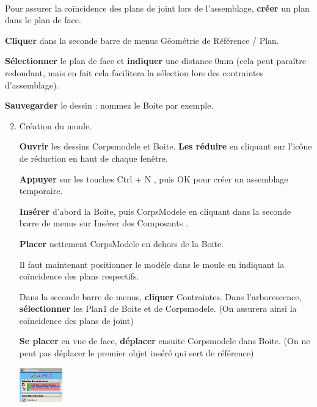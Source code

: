  ~\
 
Pour assurer la coïncidence des plans de joint lors de l'assemblage, \textbf{créer} un plan dans le plan de face.  

\textbf{Cliquer} dans la seconde barre de menus Géométrie de Référence / Plan.  

\textbf{Sélectionner} le plan de face et \textbf{indiquer} une distance 0mm (cela peut paraître redondant, mais en fait cela facilitera la sélection lors des contraintes d'assemblage). 

\textbf{Sauvegarder} le dessin : nommez le Boite par exemple.

\begin{enumerate}
 \setcounter{enumi}{1}
 \item   Création du moule. 

\textbf{Ouvrir} les dessins Corpsmodele et Boite. \textbf{Les réduire} en cliquant sur l'icône de réduction en haut de chaque fenêtre.  

\textbf{Appuyer} sur les touches \og Ctrl + N \fg, puis OK pour créer un assemblage temporaire. 

\textbf{Insérer} d'abord la Boite, puis CorpsModele en cliquant dans la seconde barre de menus sur \og Insérer des Composants \fg.

\textbf{Placer} nettement CorpsModele en dehors de la Boite. 

Il faut maintenant positionner le modèle dans le moule en indiquant la coïncidence des plans respectifs.

Dans la seconde barre de menus, \textbf{cliquer} Contraintes. Dans l'arborescence, \textbf{sélectionner} les Plan1 de Boite et de Corpsmodele. 
(On assurera ainsi la coïncidence des plans de joint)

\begin{minipage}{0.59\linewidth}
 \textbf{Se placer} en vue de face, \textbf{déplacer} ensuite Corpsmodele dans Boite. 
 (On ne peut pas déplacer le premier objet inséré qui sert de référence) 
\end{minipage}
\hfill
\begin{minipage}{0.4\linewidth}
 \centering\centering\includegraphics[height=1.5cm]{img/SW-038.png} 
\end{minipage} 
\end{enumerate}

